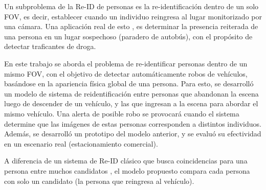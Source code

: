 \documentclass[../memoria.tex]{subfiles}
\begin{document}
Un subproblema de la Re-ID de personas es la re-identificación dentro de un solo FOV, es decir, establecer cuando un individuo reingresa al lugar monitorizado por una cámara. Una aplicación real de esto \cite{bird2005detection}, es determinar la presencia reiterada de una persona en un lugar sospechoso (paradero de autobús), con el propósito de detectar traficantes de droga.

En este trabajo se aborda el problema de re-identificar personas dentro de un mismo FOV, con el objetivo de detectar automáticamente robos de vehículos, basándose en la apariencia física global de una persona. Para esto, se desarrolló un modelo de sistema de reidentificación entre personas que abandonan la escena luego de descender de un vehículo, y las que ingresan a la escena para abordar el mismo vehículo. Una alerta de posible robo se provocará cuando el sistema determine que las imágenes de estas personas corresponden a distintos individuos. Además, se desarrolló un prototipo del modelo anterior, y se evaluó su efectividad en un escenario real (estacionamiento comercial).


A diferencia de un sistema de Re-ID clásico que busca coincidencias para una persona entre muchos candidatos \cite{hirzer2012person, prosser2010person, gray2008viewpoint, farenzena2010person, gheissari2006person}, el modelo propuesto compara cada persona con solo un candidato (la persona que reingresa al vehículo).


\end{document}
